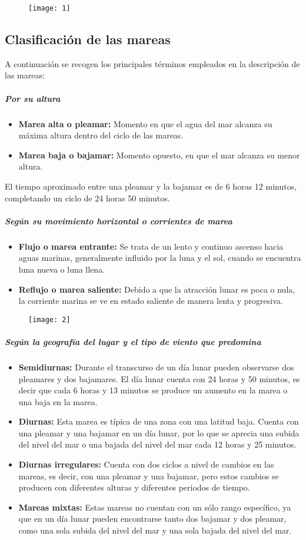 \documentclass[a4paper]{article}
\begin{document}
\begin{figure}[H]
    \centering
    \texttt{[image: 1]}
  \end{figure} 
\newpage
\subsection{Clasificación de las mareas}
A continuación se recogen los principales términos empleados en la descripción de las mareas:
\subparagraph{Por su altura} 
  \begin{itemize}
  \item \textbf{Marea alta o pleamar:} Momento en que el agua del mar alcanza su máxima altura dentro del ciclo de las mareas.
  \item \textbf{Marea baja o bajamar:} Momento opuesto, en que el mar alcanza su menor altura.
  \end{itemize}
  El tiempo aproximado entre una pleamar y la bajamar es de 6 horas 12 minutos, completando un ciclo de 24 horas 50 minutos.
  
\subparagraph{Según su movimiento horizontal o corrientes de marea}
  \begin{itemize} 
  \item \textbf{Flujo o marea entrante:} Se trata de un lento y continuo ascenso hacia aguas marinas, generalmente influido por la luna y el sol, cuando se encuentra luna nueva o luna llena.
  \item \textbf{Reflujo o marea saliente:} Debido a que la atracción lunar es poca o nula, la corriente marina se ve en estado saliente de manera lenta y progresiva.
  \end{itemize}
  
\begin{figure}[H]
    \centering
    \texttt{[image: 2]}
  \end{figure} 

\subparagraph{Según la geografía del lugar y el tipo de viento que predomina}
  \begin{itemize}
  \item \textbf{Semidiurnas:} Durante el transcurso de un día lunar pueden observarse dos pleamares y dos bajamares. El día lunar cuenta con 24 horas y 50 minutos, es decir que cada 6 horas y 13 minutos se produce un aumento en la marea o una baja en la marea. 
  \item \textbf{Diurnas:} Esta marea es típica de una zona con una latitud baja. Cuenta con una pleamar y una bajamar en un día lunar, por lo que se aprecia una subida del nivel del mar o una bajada del nivel del mar cada 12 horas y 25 minutos.
  \item \textbf{Diurnas irregulares:} Cuenta con dos ciclos a nivel de cambios en las mareas, es decir, con una pleamar y una bajamar, pero estos cambios se producen con diferentes alturas y diferentes periodos de tiempo.
  \item \textbf{Mareas mixtas:} Estas mareas no cuentan con un sólo rango específico, ya que en un día lunar pueden encontrarse tanto dos bajamar y dos pleamar, como una sola subida del nivel del mar y una sola bajada del nivel del mar.
  \end{itemize}
\end{document}
